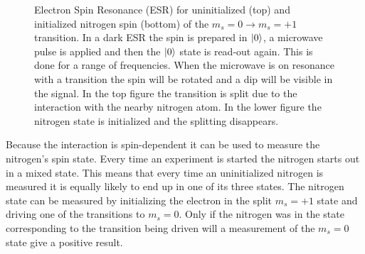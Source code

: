     \begin{figure}[htbp]
    \centering
        \caption{ Electron Spin Resonance (ESR) for uninitialized (top) and initialized nitrogen spin (bottom) of the $m_s =0 \rightarrow m_s = +1$ transition. In a dark ESR the spin is prepared in ${\left\vert{0}\right\rangle}$, a microwave pulse is applied and then the ${\left\vert{0}\right\rangle}$ state is read-out again. This is done for a range of frequencies. When the microwave is on resonance with a transition the spin will be rotated and a dip will be visible in the signal. In the top figure the transition is split due to the interaction with the nearby nitrogen atom. In the lower figure the nitrogen state is initialized and the splitting disappears.}
        \label{fig:HF_split_levels}
    \end{figure}

Because the interaction is spin-dependent it can be used to measure the nitrogen's spin state.
Every time an experiment is started the nitrogen starts out in a mixed state.
This means that every time an uninitialized nitrogen is measured it is equally likely to end up in one of its three states.
The nitrogen state can be measured by initializing the electron in the split $m_s = +1$ state and driving one of the transitions to $m_s=0$.
Only if the nitrogen was in the state corresponding to the transition being driven will a measurement of the $m_s =0$ state give a positive result.

